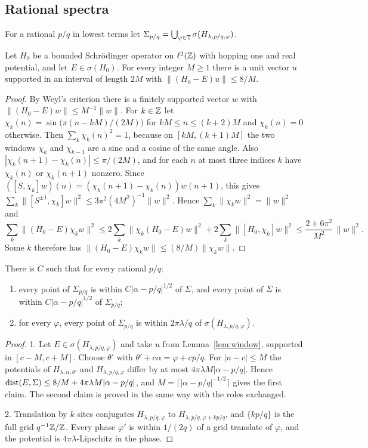 \subsection{Rational spectra}

For a rational $p/q$ in lowest terms let $\Sigma_{p/q}=\bigcup_{\varphi\in\mathbb T}\sigma(H_{\lambda,p/q,\varphi})$.

\begin{lemma}\label{lem:window}
Let $H_0$ be a bounded Schr\"odinger operator on $\ell^2(\mathbb Z)$ with hopping one and real potential, and let $E\in\sigma(H_0)$. For every integer $M\ge1$ there is a unit vector $u$ supported in an interval of length $2M$ with $\|(H_0-E)u\|\le 8/M$.
\end{lemma}

\begin{proof}
By Weyl's criterion there is a finitely supported vector $w$ with $\|(H_0-E)w\|\le M^{-1}\|w\|$. For $k\in\mathbb Z$ let $\chi_k(n)=\sin\bigl(\pi(n-kM)/(2M)\bigr)$ for $kM\le n\le (k+2)M$ and $\chi_k(n)=0$ otherwise. Then $\sum_k\chi_k(n)^2=1$, because on $[kM,(k+1)M]$ the two windows $\chi_k$ and $\chi_{k-1}$ are a sine and a cosine of the same angle. Also $|\chi_k(n+1)-\chi_k(n)|\le\pi/(2M)$, and for each $n$ at most three indices $k$ have $\chi_k(n)$ or $\chi_k(n+1)$ nonzero. Since $([S,\chi_k]w)(n)=(\chi_k(n+1)-\chi_k(n))w(n+1)$, this gives $\sum_k\|[S^{\pm1},\chi_k]w\|^2\le 3\pi^2(4M^2)^{-1}\|w\|^2$. Hence $\sum_k\|\chi_kw\|^2=\|w\|^2$ and
\[
\sum_k\|(H_0-E)\chi_kw\|^2\le2\sum_k\|\chi_k(H_0-E)w\|^2+2\sum_k\|[H_0,\chi_k]w\|^2\le\frac{2+6\pi^2}{M^2}\,\|w\|^2.
\]
Some $k$ therefore has $\|(H_0-E)\chi_kw\|\le (8/M)\|\chi_kw\|$.
\end{proof}

\begin{lemma}\label{lem:ratspec}
There is $C$ such that for every rational $p/q$:
\begin{enumerate}
\item every point of $\Sigma_{p/q}$ is within $C|\alpha-p/q|^{1/2}$ of $\Sigma$, and every point of $\Sigma$ is within $C|\alpha-p/q|^{1/2}$ of $\Sigma_{p/q}$;
\item for every $\varphi$, every point of $\Sigma_{p/q}$ is within $2\pi\lambda/q$ of $\sigma(H_{\lambda,p/q,\varphi})$.
\end{enumerate}
\end{lemma}

\begin{proof}
1. Let $E\in\sigma(H_{\lambda,p/q,\varphi})$ and take $u$ from Lemma~\ref{lem:window}, supported in $[c-M,c+M]$. Choose $\theta'$ with $\theta'+c\alpha=\varphi+cp/q$. For $|n-c|\le M$ the potentials of $H_{\lambda,\alpha,\theta'}$ and $H_{\lambda,p/q,\varphi}$ differ by at most $4\pi\lambda M|\alpha-p/q|$. Hence $\operatorname{dist}(E,\Sigma)\le 8/M+4\pi\lambda M|\alpha-p/q|$, and $M=\lceil|\alpha-p/q|^{-1/2}\rceil$ gives the first claim. The second claim is proved in the same way with the roles exchanged.

2. Translation by $k$ sites conjugates $H_{\lambda,p/q,\varphi}$ to $H_{\lambda,p/q,\varphi+kp/q}$, and $\{kp/q\}$ is the full grid $q^{-1}\mathbb Z/\mathbb Z$. Every phase $\varphi'$ is within $1/(2q)$ of a grid translate of $\varphi$, and the potential is $4\pi\lambda$-Lipschitz in the phase.
\end{proof}
